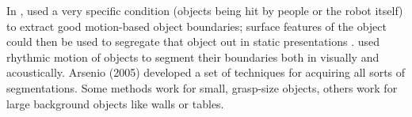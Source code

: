 
%


\ifverbose
%
In , used
a very specific condition (objects being hit by
people or the robot itself) to extract good
motion-based object boundaries; surface features
of the object could then be used to segregate that
object out in static presentations \cite{fitzpatrick03object}.
 used rhythmic motion
of objects to segment their boundaries both in
visually and acoustically.
%
Arsenio (2005) developed a set of techniques for acquiring all
sorts of segmentations.  Some methods work for small, grasp-size
objects, others work for large background objects like walls or
tables.
\fi


